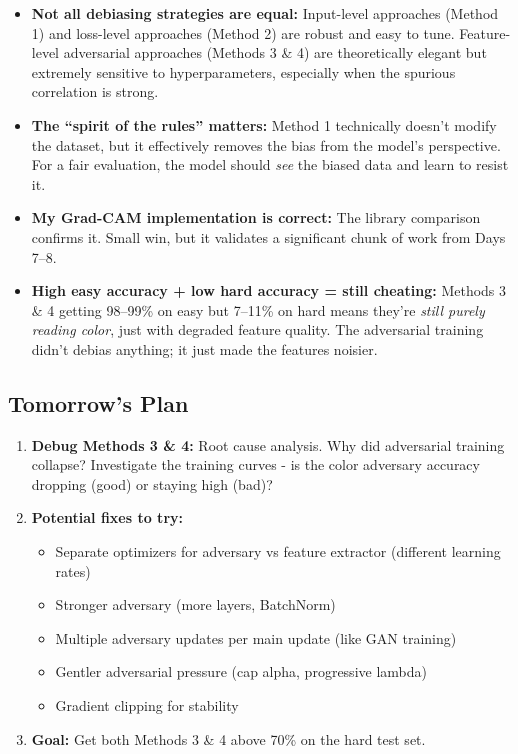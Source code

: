 \documentclass[9pt,a4paper,twocolumn,twoside]{tau-class/tau}
\begin{document}
        \begin{itemize}
            \item \textbf{Not all debiasing strategies are equal:} Input-level approaches (Method 1) and loss-level approaches (Method 2) are robust and easy to tune. Feature-level adversarial approaches (Methods 3 \& 4) are theoretically elegant but extremely sensitive to hyperparameters, especially when the spurious correlation is strong.

            \item \textbf{The ``spirit of the rules'' matters:} Method 1 technically doesn't modify the dataset, but it effectively removes the bias from the model's perspective. For a fair evaluation, the model should \textit{see} the biased data and learn to resist it.

            \item \textbf{My Grad-CAM implementation is correct:} The library comparison confirms it. Small win, but it validates a significant chunk of work from Days 7--8.

            \item \textbf{High easy accuracy + low hard accuracy = still cheating:} Methods 3 \& 4 getting 98--99\% on easy but 7--11\% on hard means they're \textit{still purely reading color}, just with degraded feature quality. The adversarial training didn't debias anything; it just made the features noisier.
        \end{itemize}

    \subsection{Tomorrow's Plan}

        \begin{enumerate}
            \item \textbf{Debug Methods 3 \& 4:} Root cause analysis. Why did adversarial training collapse? Investigate the training curves - is the color adversary accuracy dropping (good) or staying high (bad)?

            \item \textbf{Potential fixes to try:}
            \begin{itemize}
                \item Separate optimizers for adversary vs feature extractor (different learning rates)
                \item Stronger adversary (more layers, BatchNorm)
                \item Multiple adversary updates per main update (like GAN training)
                \item Gentler adversarial pressure (cap alpha, progressive lambda)
                \item Gradient clipping for stability
            \end{itemize}

            \item \textbf{Goal:} Get both Methods 3 \& 4 above 70\% on the hard test set.
        \end{enumerate}
\end{document}
